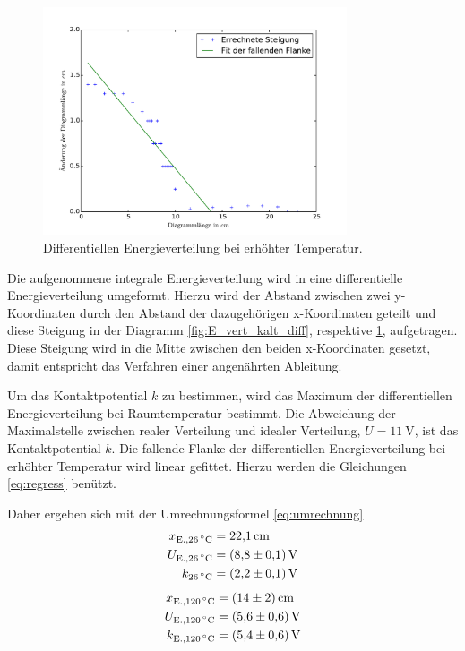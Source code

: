 \begin{figure}[p]
	\centering
	\includegraphics[width=0.8\textwidth]{Bilder/Vert_warm_diff.pdf}
	\caption{Differentiellen Energieverteilung bei erhöhter Temperatur.\cite{matplotlib}}
	\label{fig:E_vert_warm_diff}
\end{figure}
Die aufgenommene integrale Energieverteilung wird in eine differentielle Energieverteilung umgeformt.
Hierzu wird der Abstand zwischen zwei y-Koordinaten durch den Abstand der dazugehörigen x-Koordinaten geteilt und diese Steigung in der Diagramm \ref{fig:E_vert_kalt_diff}, respektive \ref{fig:E_vert_warm_diff}, aufgetragen. 
Diese Steigung wird in die Mitte zwischen den beiden x-Koordinaten gesetzt, damit entspricht das Verfahren einer angenährten Ableitung.

Um das Kontaktpotential $k$ zu bestimmen, wird das Maximum der differentiellen Energieverteilung bei Raumtemperatur bestimmt.
Die Abweichung der Maximalstelle zwischen realer Verteilung und idealer Verteilung, $U=\SI{11}{\volt}$, ist das Kontaktpotential $k$.
Die fallende Flanke der differentiellen Energieverteilung bei erhöhter Temperatur wird linear gefittet.
Hierzu werden die Gleichungen \ref{eq:regress} benützt.

Daher ergeben sich mit der Umrechnungsformel \eqref{eq:umrechnung}
\begin{align}
	x_\text{E.,\SI{26}{\degreeCelsius}}&= \SI{22.1}{\centi\meter}\\
	U_\text{E.,\SI{26}{\degreeCelsius}}&= \SI{8.8(1)}{\volt}\\
	k_\text{\SI{26}{\degreeCelsius}} &= \SI{2.2(1)}{\volt}
	\label{qu:k1}
\end{align}
\begin{align}
	x_\text{E.,\SI{120}{\degreeCelsius}}&= \SI{14(2)}{\centi\meter}\\
	U_\text{E.,\SI{120}{\degreeCelsius}}&= \SI{5.6(6)}{\volt}\\
	k_\text{E.,\SI{120}{\degreeCelsius}}&= \SI{5.4(6)}{\volt}
\end{align}

